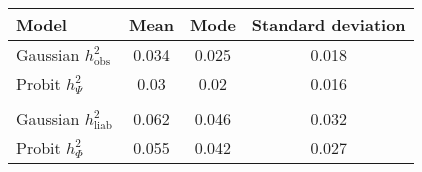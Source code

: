  \begin{tabular}{lccc}
 \hline
 Model & Mean & Mode & Standard deviation  \\ 
 \hline 

 Gaussian $h^2_\text{obs}$ & 0.034 & 0.025 & 0.018 \\ 
 Probit $h^2_{\Psi}$ & 0.03 & 0.02 & 0.016 \\ 
  & & & \\ 
 Gaussian $h^2_\text{liab}$ & 0.062 & 0.046 & 0.032 \\ 
 Probit $h^2_{\Phi}$ & 0.055 & 0.042 & 0.027 \\ 
 \bottomrule
\end{tabular}

